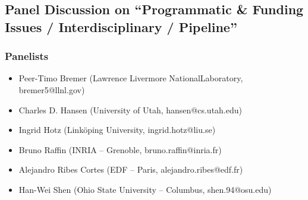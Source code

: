 \subsection{Panel Discussion on ``Programmatic \& Funding Issues / Interdisciplinary / Pipeline''}

\subsubsection{Panelists}

\begin{itemize}
\item Peer-Timo Bremer (Lawrence Livermore NationalLaboratory, bremer5@llnl.gov)
\item Charles D. Hansen (University of Utah, hansen@cs.utah.edu)
\item Ingrid Hotz (Linköping University, ingrid.hotz@liu.se)
\item Bruno Raffin (INRIA -- Grenoble, bruno.raffin@inria.fr)
\item Alejandro Ribes Cortes (EDF -- Paris, alejandro.ribes@edf.fr)
\item Han-Wei Shen (Ohio State University -- Columbus, shen.94@osu.edu)
\end{itemize}

